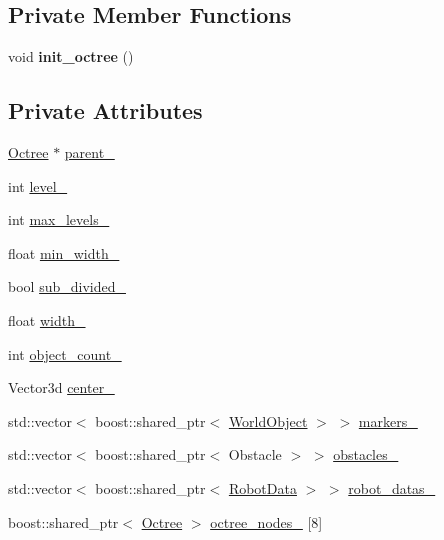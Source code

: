 \subsection*{Private Member Functions}
\begin{CompactItemize}
\item 
\hypertarget{class_octree_311009ce6bc730b736fccde2f3b840d8}{
void \textbf{init\_\-octree} ()}
\label{class_octree_311009ce6bc730b736fccde2f3b840d8}

\end{CompactItemize}
\subsection*{Private Attributes}
\begin{CompactItemize}
\item 
\hyperlink{class_octree}{Octree} $\ast$ \hyperlink{class_octree_513527d29f670449b0a665625d476ad6}{parent\_\-}
\item 
int \hyperlink{class_octree_3955482b438c39aef803253592306217}{level\_\-}
\item 
int \hyperlink{class_octree_1b29e2ff7de0ce212008fc928de2e8c0}{max\_\-levels\_\-}
\item 
float \hyperlink{class_octree_d8300c6fe2f72671675b351e8b4e65db}{min\_\-width\_\-}
\item 
bool \hyperlink{class_octree_1ff3eebef24edecea4359fdaa994d26d}{sub\_\-divided\_\-}
\item 
float \hyperlink{class_octree_8f8660a65257ea4368c6ba2e57df86fc}{width\_\-}
\item 
int \hyperlink{class_octree_0faf7b0d6e445aee6e6954d4efdafcf9}{object\_\-count\_\-}
\item 
Vector3d \hyperlink{class_octree_d1830408734e4435f934a6cb31a0c8a4}{center\_\-}
\item 
std::vector$<$ boost::shared\_\-ptr$<$ \hyperlink{class_world_object}{WorldObject} $>$ $>$ \hyperlink{class_octree_420b03d97b1631a2809b3b4929a84e89}{markers\_\-}
\item 
std::vector$<$ boost::shared\_\-ptr$<$ Obstacle $>$ $>$ \hyperlink{class_octree_7ba27f0c60cc3eceb10799bcc43e8acf}{obstacles\_\-}
\item 
std::vector$<$ boost::shared\_\-ptr$<$ \hyperlink{class_robot_data}{RobotData} $>$ $>$ \hyperlink{class_octree_f93af4c2615db522f4496fd050a5b61b}{robot\_\-datas\_\-}
\item 
boost::shared\_\-ptr$<$ \hyperlink{class_octree}{Octree} $>$ \hyperlink{class_octree_a7b4d7aa295f945512b9e39d8fd2d5d6}{octree\_\-nodes\_\-} \mbox{[}8\mbox{]}
\end{CompactItemize}
